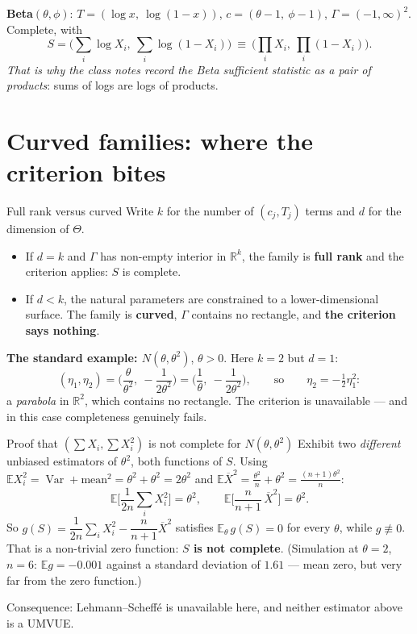 \documentclass[11pt]{article}
\newcommand{\E}{\mathbb{E}}
\newcommand{\Var}{\operatorname{Var}}
\newcommand{\R}{\mathbb{R}}
\newcommand{\Xbar}{\overline{X}}
\begin{document}
\smallskip
\textbf{Beta$(\theta,\phi)$}: $T=(\log x,\ \log(1-x))$, $c=(\theta-1,\ \phi-1)$,
$\Gamma=(-1,\infty)^{2}$. Complete, with
\[
S=\Big(\sum_i\log X_i,\ \sum_i\log(1-X_i)\Big)
\ \equiv\ \Big(\prod_iX_i,\ \prod_i(1-X_i)\Big).
\]
\emph{That is why the class notes record the Beta sufficient statistic as a pair of
products}: sums of logs are logs of products.

\section{Curved families: where the criterion bites}

\begin{idea}{Full rank versus curved}
Write $k$ for the number of $(c_j,T_j)$ terms and $d$ for the dimension of $\Theta$.
\begin{itemize}
\item If $d=k$ and $\Gamma$ has non-empty interior in $\R^{k}$, the family is \textbf{full
rank} and the criterion applies: $S$ is complete.
\item If $d<k$, the natural parameters are constrained to a lower-dimensional surface. The
family is \textbf{curved}, $\Gamma$ contains no rectangle, and \textbf{the criterion says
nothing}.
\end{itemize}
\end{idea}

\textbf{The standard example: $N(\theta,\theta^{2})$}, $\theta>0$. Here $k=2$ but $d=1$:
\[
(\eta_1,\eta_2)=\Big(\frac{\theta}{\theta^{2}},\ -\frac{1}{2\theta^{2}}\Big)
=\Big(\frac1\theta,\ -\frac{1}{2\theta^{2}}\Big),
\qquad\text{so}\qquad \eta_2=-\tfrac12\eta_1^{2}:
\]
a \emph{parabola} in $\R^{2}$, which contains no rectangle. The criterion is unavailable ---
and in this case completeness genuinely fails.

\begin{idea}{Proof that $(\sum X_i,\sum X_i^{2})$ is not complete for $N(\theta,\theta^{2})$}
Exhibit two \emph{different} unbiased estimators of $\theta^{2}$, both functions of $S$. Using
$\E X_i^{2}=\Var+\text{mean}^2=\theta^{2}+\theta^{2}=2\theta^{2}$ and
$\E\Xbar^{2}=\tfrac{\theta^{2}}{n}+\theta^{2}=\tfrac{(n+1)\theta^{2}}{n}$:
\[
\E\Big[\frac{1}{2n}\sum_iX_i^{2}\Big]=\theta^{2},
\qquad
\E\Big[\frac{n}{n+1}\,\Xbar^{2}\Big]=\theta^{2}.
\]
So $g(S)=\dfrac{1}{2n}\sum_iX_i^{2}-\dfrac{n}{n+1}\Xbar^{2}$ satisfies
$\E_\theta\,g(S)=0$ for every $\theta$, while $g\not\equiv0$. That is a non-trivial zero
function: \textbf{$S$ is not complete}. (Simulation at $\theta=2$, $n=6$: $\E g=-0.001$ against
a standard deviation of $1.61$ --- mean zero, but very far from the zero function.)

Consequence: Lehmann--Scheff\'e is unavailable here, and neither estimator above is a UMVUE.
\end{idea}
\end{document}
